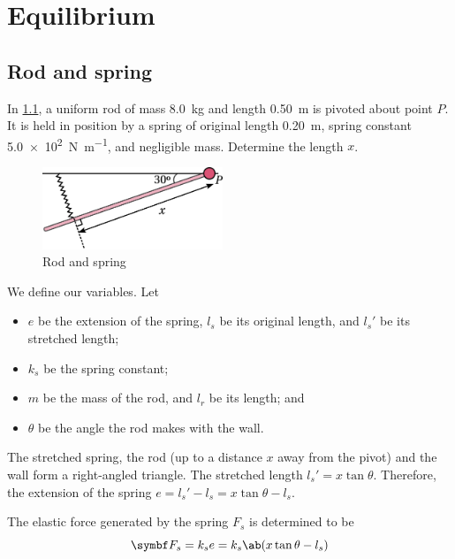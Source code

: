 \chapter{Equilibrium}

\section{Rod and spring}
\begin{problem}
  In \cref{fig:rodspring}, a uniform rod of mass \qty{8.0}{\kg} and
  length \qty{0.50}{\metre}
  is pivoted about point \(P\). It is held in position by a spring of
  original length \qty{0.20}{\metre},
  spring constant \qty{5.0e2}{\newton\per\metre}, and negligible mass.
  Determine the length \(x\).
\end{problem}
\begin{figure}
  \centering
  \includegraphics[width=0.48\textwidth]{assets/rodspring.png}
  \caption{Rod and spring}
  \label{fig:rodspring}
\end{figure}
We define our variables. Let
\begin{itemize}
  \item \(e\) be the extension of the spring, \(l_s\) be its original
    length, and \({l_s}'\) be its stretched length;
  \item \(k_s\) be the spring constant;
  \item \(m\) be the mass of the rod, and \(l_r\) be its length; and
  \item \(\theta\) be the angle the rod makes with the wall.
\end{itemize}

The stretched spring, the rod (up to a distance \(x\) away from the
pivot) and the wall
form a right-angled triangle. The stretched length \({l_s}' = x \tan \theta\).
Therefore, the extension of the spring \(e = {l_s}'-l_s = x\tan\theta - l_s\).

The elastic force generated by the spring \(F_s\) is determined to be
\begin{equation}
  \mv{F}_s = k_se = k_s\ab(x\tan\theta-l_s)
  \label{eq:elasticforce}
\end{equation}

